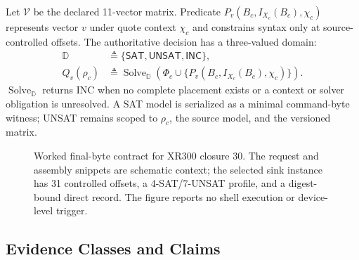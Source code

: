 Let $\mathcal{V}$ be the declared 11-vector matrix. Predicate
$P_v(B_c,I_{X_c}(B_c),\chi_c)$ represents vector $v$ under quote context
$\chi_c$ and constrains syntax only at source-controlled offsets.
The authoritative decision has a three-valued domain:
\begin{equation}
\begin{aligned}
\mathbb{D}&\triangleq\{\mathsf{SAT},\mathsf{UNSAT},\mathsf{INC}\},\\[-1mm]
Q_v(\rho_c)&\triangleq\operatorname{Solve}_{\mathbb{D}}
\!\left(\Phi_c\cup\{P_v(B_c,I_{X_c}(B_c),\chi_c)\}\right).
\end{aligned}
\label{eq:vector-query}
\end{equation}
$\operatorname{Solve}_{\mathbb{D}}$ returns \textsf{INC} when no complete
placement exists or a context or solver obligation is unresolved. A SAT model
is serialized as a minimal command-byte witness; UNSAT remains scoped to
$\rho_c$, the source model, and the versioned matrix.

\begin{figure}[!t]
\centering

\caption{Worked final-byte contract for XR300 closure 30. The request and
assembly snippets are schematic context; the selected sink instance has 31
controlled offsets, a 4-SAT/7-UNSAT profile, and a digest-bound direct
\svsat record. The figure reports no shell execution or device-level trigger.}
\label{fig:contract}
\end{figure}

\subsection{Evidence Classes and Claims}


